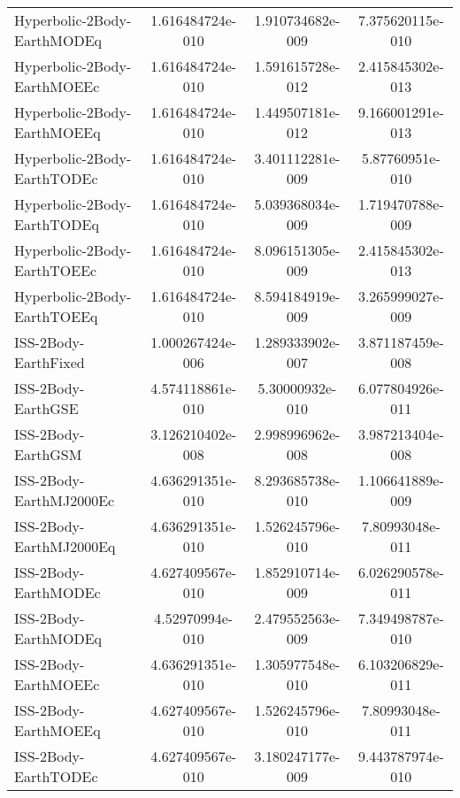 \begin{table}[htbp!]
\begin{tabular}{lccc}
         Hyperbolic-2Body-EarthMODEq & 1.616484724e-010 & 1.910734682e-009 & 7.375620115e-010 \\
         Hyperbolic-2Body-EarthMOEEc & 1.616484724e-010 & 1.591615728e-012 & 2.415845302e-013 \\
         Hyperbolic-2Body-EarthMOEEq & 1.616484724e-010 & 1.449507181e-012 & 9.166001291e-013 \\
         Hyperbolic-2Body-EarthTODEc & 1.616484724e-010 & 3.401112281e-009 & 5.87760951e-010 \\
         Hyperbolic-2Body-EarthTODEq & 1.616484724e-010 & 5.039368034e-009 & 1.719470788e-009 \\
         Hyperbolic-2Body-EarthTOEEc & 1.616484724e-010 & 8.096151305e-009 & 2.415845302e-013 \\
         Hyperbolic-2Body-EarthTOEEq & 1.616484724e-010 & 8.594184919e-009 & 3.265999027e-009 \\
         ISS-2Body-EarthFixed & 1.000267424e-006 & 1.289333902e-007 & 3.871187459e-008 \\
         ISS-2Body-EarthGSE & 4.574118861e-010 & 5.30000932e-010 & 6.077804926e-011 \\
         ISS-2Body-EarthGSM & 3.126210402e-008 & 2.998996962e-008 & 3.987213404e-008 \\
         ISS-2Body-EarthMJ2000Ec & 4.636291351e-010 & 8.293685738e-010 & 1.106641889e-009 \\
         ISS-2Body-EarthMJ2000Eq & 4.636291351e-010 & 1.526245796e-010 & 7.80993048e-011 \\
         ISS-2Body-EarthMODEc & 4.627409567e-010 & 1.852910714e-009 & 6.026290578e-011 \\
         ISS-2Body-EarthMODEq & 4.52970994e-010 & 2.479552563e-009 & 7.349498787e-010 \\
         ISS-2Body-EarthMOEEc & 4.636291351e-010 & 1.305977548e-010 & 6.103206829e-011 \\
         ISS-2Body-EarthMOEEq & 4.627409567e-010 & 1.526245796e-010 & 7.80993048e-011 \\
         ISS-2Body-EarthTODEc & 4.627409567e-010 & 3.180247177e-009 & 9.443787974e-010 \\

\end{tabular}
\end{table}
